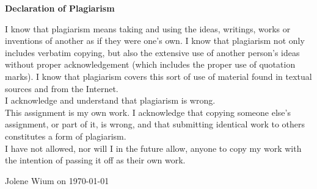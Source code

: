 
\begin{center}
    {\LARGE \textbf{Declaration of Plagiarism}}
\end{center}

\vspace{2cm}

\begin{center}


    I know that plagiarism means taking and using the ideas, writings, works
    or inventions of another as if they were one’s own. I know that plagiarism
    not only includes verbatim copying, but also the extensive use of another
    person’s ideas without proper acknowledgement (which includes the
    proper use of quotation marks). I know that plagiarism covers this sort of
    use of material found in textual sources and from the Internet.\\
    I acknowledge and understand that plagiarism is wrong.\\
    This assignment is my own work. I acknowledge that copying someone else’s assignment, or part
    of it, is wrong, and that submitting identical work to others constitutes a
    form of plagiarism.\\
    I have not allowed, nor will I in the future allow, anyone to copy my work
    with the intention of passing it off as their own work.

        
\end{center}
\vspace{1.5cm} 
Jolene Wium on \today


\newpage